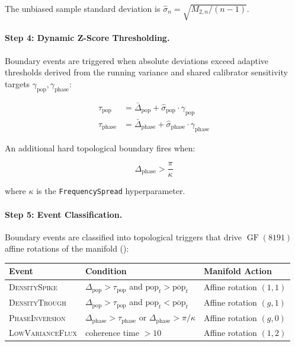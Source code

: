 The unbiased sample standard deviation is $\hat{\sigma}_n = \sqrt{M_{2,n} / (n-1)}$.

\paragraph{Step 4: Dynamic Z-Score Thresholding.}
Boundary events are triggered when absolute deviations exceed
adaptive thresholds derived from the running variance and shared
calibrator sensitivity targets $\gamma_{\text{pop}}, \gamma_{\text{phase}}$:

\begin{align}
  \tau_{\text{pop}} &= \bar{\Delta}_{\text{pop}} + \hat{\sigma}_{\text{pop}}
                      \cdot \gamma_{\text{pop}}
  \label{eq:thresh_pop} \\
  \tau_{\text{phase}} &= \bar{\Delta}_{\text{phase}}
                        + \hat{\sigma}_{\text{phase}}
                        \cdot \gamma_{\text{phase}}
  \label{eq:thresh_phase}
\end{align}

An additional hard topological boundary fires when:

\begin{equation}
  \Delta_{\text{phase}} > \frac{\pi}{\kappa}
  \label{eq:topo_bound}
\end{equation}

where $\kappa$ is the \texttt{FrequencySpread} hyperparameter.

\paragraph{Step 5: Event Classification.}
Boundary events are classified into topological triggers that drive
$\operatorname{GF}(8191)$ affine rotations of the manifold
():

\begin{center}
\begin{tabular}{lll}
  \toprule
  \textbf{Event} & \textbf{Condition} & \textbf{Manifold Action} \\
  \midrule
  \textsc{DensitySpike}
    & $\Delta_{\text{pop}} > \tau_{\text{pop}}$ and
      $\text{pop}_t > \overline{\text{pop}}_t$
    & Affine rotation $(1, 1)$ \\
  \textsc{DensityTrough}
    & $\Delta_{\text{pop}} > \tau_{\text{pop}}$ and
      $\text{pop}_t < \overline{\text{pop}}_t$
    & Affine rotation $(g, 1)$ \\
  \textsc{PhaseInversion}
    & $\Delta_{\text{phase}} > \tau_{\text{phase}}$ or
      $\Delta_{\text{phase}} > \pi/\kappa$
    & Affine rotation $(g, 0)$ \\
  \textsc{LowVarianceFlux}
    & coherence time $> 10$
    & Affine rotation $(1, 2)$ \\
  \bottomrule
\end{tabular}
\end{center}

